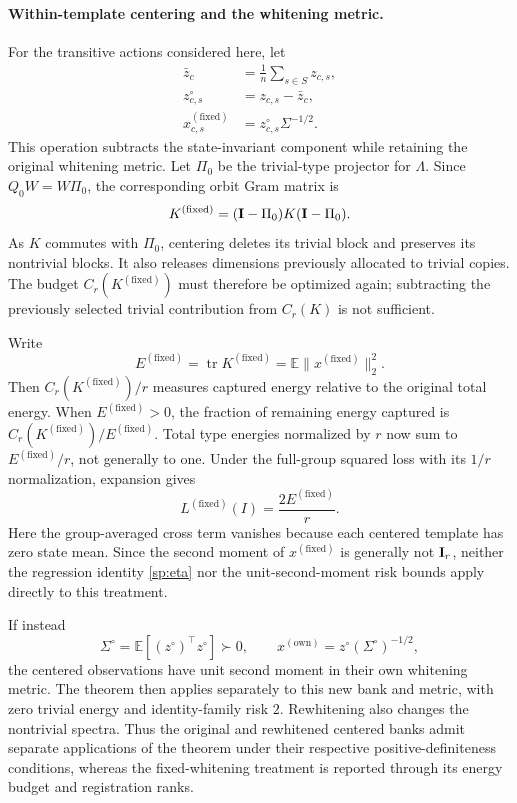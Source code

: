 \paragraph{Within-template centering and the whitening metric.}
For the transitive actions considered here, let
\[
 \begin{aligned}
 \bar z_c
 &=
 \frac1n\sum_{s\in S}z_{c,s},
 \\
 z^\circ_{c,s}
 &=
 z_{c,s}-\bar z_c,
 \\
 x^{(\mathrm{fixed})}_{c,s}
 &=
 z^\circ_{c,s}\Sigma^{-1/2}.
 \end{aligned}
\]
This operation subtracts the state-invariant component while retaining the original whitening metric. Let $\Pi_0$ be the trivial-type projector for $\Lambda$. Since $Q_0W=W\Pi_0$, the corresponding orbit Gram matrix is
\[
 K^{(\mathrm{fixed})}
 =(\mathbf{I}-\Pi_0)K(\mathbf{I}-\Pi_0).
\]
As $K$ commutes with $\Pi_0$, centering deletes its trivial block and preserves its nontrivial blocks. It also releases dimensions previously allocated to trivial copies. The budget $C_r(K^{(\mathrm{fixed})})$ must therefore be optimized again; subtracting the previously selected trivial contribution from $C_r(K)$ is not sufficient.

Write
\[
 E^{(\mathrm{fixed})}
 =\operatorname{tr}K^{(\mathrm{fixed})}
 =\mathbb E\|x^{(\mathrm{fixed})}\|_2^2.
\]
Then $C_r(K^{(\mathrm{fixed})})/r$ measures captured energy relative to the original total energy. When $E^{(\mathrm{fixed})}>0$, the fraction of remaining energy captured is
$C_r(K^{(\mathrm{fixed})})/E^{(\mathrm{fixed})}$.
Total type energies normalized by $r$ now sum to
$E^{(\mathrm{fixed})}/r$, not generally to one. Under the full-group squared loss with its $1/r$ normalization, expansion gives
\[
 L^{(\mathrm{fixed})}(I)=\frac{2E^{(\mathrm{fixed})}}r.
\]
Here the group-averaged cross term vanishes because each centered template has zero state mean. Since the second moment of $x^{(\mathrm{fixed})}$ is generally not $\mathbf{I}_r$, neither the regression identity \eqref{sp:eta} nor the unit-second-moment risk bounds apply directly to this treatment.

If instead
\[
 \Sigma^\circ
 =\mathbb E[(z^\circ)^\top z^\circ]\succ0,
 \qquad
 x^{(\mathrm{own})}=z^\circ(\Sigma^\circ)^{-1/2},
\]
the centered observations have unit second moment in their own whitening metric. The theorem then applies separately to this new bank and metric, with zero trivial energy and identity-family risk $2$. Rewhitening also changes the nontrivial spectra. Thus the original and rewhitened centered banks admit separate applications of the theorem under their respective positive-definiteness conditions, whereas the fixed-whitening treatment is reported through its energy budget and registration ranks.

